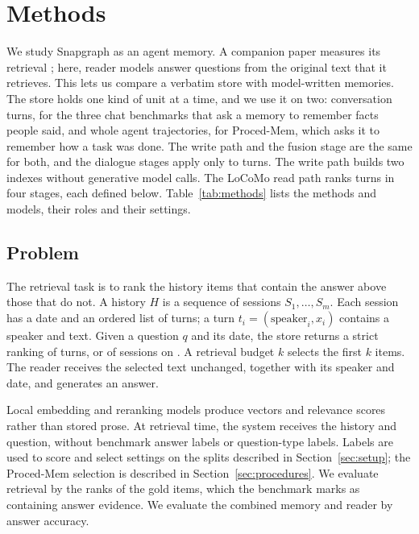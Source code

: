 \section{Methods}
\label{sec:turns}

We study Snapgraph as an agent memory. A companion paper measures its retrieval \citep{snapgraph2026}; here, reader models answer questions from the original text that it retrieves. This lets us compare a verbatim store with model-written memories. The store holds one kind of unit at a time, and we use it on two: conversation turns, for the three chat benchmarks that ask a memory to remember facts people said, and whole agent trajectories, for Proced-Mem, which asks it to remember how a task was done. The write path and the fusion stage are the same for both, and the dialogue stages apply only to turns. The write path builds two indexes without generative model calls. The LoCoMo read path ranks turns in four stages, each defined below. Table~\ref{tab:methods} lists the methods and models, their roles and their settings.

\subsection{Problem}
The retrieval task is to rank the history items that contain the answer above those that do not. A history $H$ is a sequence of sessions $S_1, \dots, S_m$. Each session has a date and an ordered list of turns; a turn $t_i = (\mathrm{speaker}_i, x_i)$ contains a speaker and text. Given a question $q$ and its date, the store returns a strict ranking of turns, or of sessions on \lmes{}. A retrieval budget $k$ selects the first $k$ items. The reader receives the selected text unchanged, together with its speaker and date, and generates an answer.

Local embedding and reranking models produce vectors and relevance scores rather than stored prose. At retrieval time, the system receives the history and question, without benchmark answer labels or question-type labels. Labels are used to score and select settings on the splits described in Section~\ref{sec:setup}; the Proced-Mem selection is described in Section~\ref{sec:procedures}. We evaluate retrieval by the ranks of the gold items, which the benchmark marks as containing answer evidence. We evaluate the combined memory and reader by answer accuracy.

